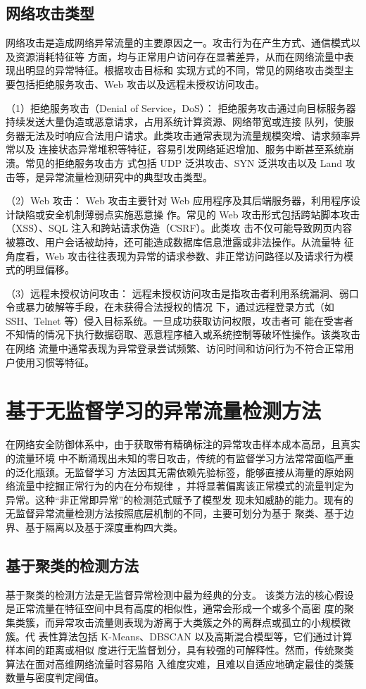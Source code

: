 \subsection{网络攻击类型}
网络攻击是造成网络异常流量的主要原因之一。攻击行为在产生方式、通信模式以及资源消耗特征等
方面，均与正常用户访问存在显著差异，从而在网络流量中表现出明显的异常特征。根据攻击目标和
实现方式的不同，常见的网络攻击类型主要包括拒绝服务攻击、Web 攻击以及远程未授权访问攻击。

（1）拒绝服务攻击（Denial of Service，DoS）：
拒绝服务攻击通过向目标服务器持续发送大量伪造或恶意请求，占用系统计算资源、网络带宽或连接
队列，使服务器无法及时响应合法用户请求。此类攻击通常表现为流量规模突增、请求频率异常以及
连接状态异常堆积等特征，容易引发网络延迟增加、服务中断甚至系统崩溃。常见的拒绝服务攻击方
式包括 UDP 泛洪攻击、SYN 泛洪攻击以及 Land 攻击等，是异常流量检测研究中的典型攻击类型。

（2）Web 攻击：
Web 攻击主要针对 Web 应用程序及其后端服务器，利用程序设计缺陷或安全机制薄弱点实施恶意操
作。常见的 Web 攻击形式包括跨站脚本攻击（XSS）、SQL 注入和跨站请求伪造（CSRF）。此类攻
击不仅可能导致网页内容被篡改、用户会话被劫持，还可能造成数据库信息泄露或非法操作。从流量特
征角度看，Web 攻击往往表现为异常的请求参数、非正常访问路径以及请求行为模式的明显偏移。

（3）远程未授权访问攻击：
远程未授权访问攻击是指攻击者利用系统漏洞、弱口令或暴力破解等手段，在未获得合法授权的情况
下，通过远程登录方式（如 SSH、Telnet 等）侵入目标系统。一旦成功获取访问权限，攻击者可
能在受害者不知情的情况下执行数据窃取、恶意程序植入或系统控制等破坏性操作。该类攻击在网络
流量中通常表现为异常登录尝试频繁、访问时间和访问行为不符合正常用户使用习惯等特征。

\section{基于无监督学习的异常流量检测方法}
在网络安全防御体系中，由于获取带有精确标注的异常攻击样本成本高昂，且真实的流量环境
中不断涌现出未知的零日攻击，传统的有监督学习方法常常面临严重的泛化瓶颈。无监督学习
方法因其无需依赖先验标签，能够直接从海量的原始网络流量中挖掘正常行为的内在分布规律
，并将显著偏离该正常模式的流量判定为异常。这种“非正常即异常”的检测范式赋予了模型发
现未知威胁的能力。现有的无监督异常流量检测方法按照底层机制的不同，主要可划分为基于
聚类、基于边界、基于隔离以及基于深度重构四大类\cite{kozik2024survey}。

\subsection{基于聚类的检测方法}
基于聚类的检测方法是无监督异常检测中最为经典的分支\cite{kakade2024network}。
该类方法的核心假设是正常流量在特征空间中具有高度的相似性，通常会形成一个或多个高密
度的聚集类簇，而异常攻击流量则表现为游离于大类簇之外的离群点或孤立的小规模微簇。代
表性算法包括 K-Means、DBSCAN 以及高斯混合模型等，它们通过计算样本间的距离或相似
度进行无监督划分，具有较强的可解释性。然而，传统聚类算法在面对高维网络流量时容易陷
入维度灾难，且难以自适应地确定最佳的类簇数量与密度判定阈值。


